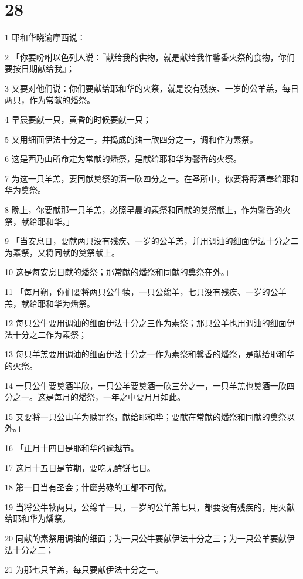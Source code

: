\chapter{28}

\par 1 耶和华晓谕摩西说：
\par 2 「你要吩咐以色列人说：『献给我的供物，就是献给我作馨香火祭的食物，你们要按日期献给我』；
\par 3 又要对他们说：你们要献给耶和华的火祭，就是没有残疾、一岁的公羊羔，每日两只，作为常献的燔祭。
\par 4 早晨要献一只，黄昏的时候要献一只；
\par 5 又用细面伊法十分之一，并捣成的油一欣四分之一，调和作为素祭。
\par 6 这是西乃山所命定为常献的燔祭，是献给耶和华为馨香的火祭。
\par 7 为这一只羊羔，要同献奠祭的酒一欣四分之一。在圣所中，你要将醇酒奉给耶和华为奠祭。
\par 8 晚上，你要献那一只羊羔，必照早晨的素祭和同献的奠祭献上，作为馨香的火祭，献给耶和华。」
\par 9 「当安息日，要献两只没有残疾、一岁的公羊羔，并用调油的细面伊法十分之二为素祭，又将同献的奠祭献上。
\par 10 这是每安息日献的燔祭；那常献的燔祭和同献的奠祭在外。」
\par 11 「每月朔，你们要将两只公牛犊，一只公绵羊，七只没有残疾、一岁的公羊羔，献给耶和华为燔祭。
\par 12 每只公牛要用调油的细面伊法十分之三作为素祭；那只公羊也用调油的细面伊法十分之二作为素祭；
\par 13 每只羊羔要用调油的细面伊法十分之一作为素祭和馨香的燔祭，是献给耶和华的火祭。
\par 14 一只公牛要奠酒半欣，一只公羊要奠酒一欣三分之一，一只羊羔也奠酒一欣四分之一。这是每月的燔祭，一年之中要月月如此。
\par 15 又要将一只公山羊为赎罪祭，献给耶和华；要献在常献的燔祭和同献的奠祭以外。」
\par 16 「正月十四日是耶和华的逾越节。
\par 17 这月十五日是节期，要吃无酵饼七日。
\par 18 第一日当有圣会；什麽劳碌的工都不可做。
\par 19 当将公牛犊两只，公绵羊一只，一岁的公羊羔七只，都要没有残疾的，用火献给耶和华为燔祭。
\par 20 同献的素祭用调油的细面；为一只公牛要献伊法十分之三；为一只公羊要献伊法十分之二；
\par 21 为那七只羊羔，每只要献伊法十分之一。
